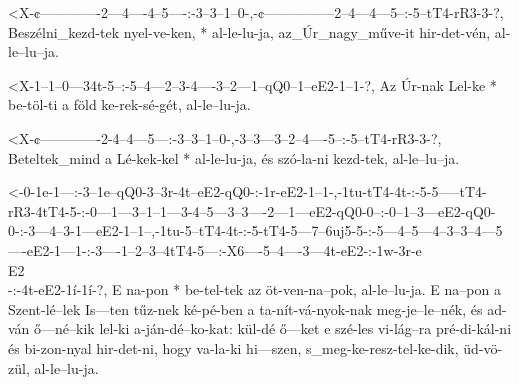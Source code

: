   {<X-¢-------------2---4----4--5----:-3--3--1--0-,-¢---------------2--4---4---5--:-5--tT4-rR3-3-?,}
  {   Beszélni_kezd-tek nyel-ve-ken, * al-le-lu-ja, az_Úr_nagy_műve-it hir-det-vén, al-le--lu--ja.}


  {<X-1--1--0---34t-5--:-5--4---2--3-4----3--2---1--qQ0--1--eE2-1--1-?,}
  {   Az Úr-nak Lel-ke * be-töl-ti a föld ke-rek-sé-gét, al-le--lu-ja.}

  {<X-¢-------------2-4--4---5---:-3--3--1--0-,-3--3---3--2--4----5--:-5--tT4-rR3-3-?,}
  {   Beteltek_mind a Lé-kek-kel * al-le-lu-ja, és szó-la-ni kezd-tek, al-le--lu--ja.}

  {<-0-1e-1---:-3--1e--qQ0-3--3r-4t--eE2-qQ0-:-1r-eE2-1--1-,-1tu-tT4-4t-:-5-5-----tT4-rR3-4tT4-5-:-0---1---3--1--1---3-4--5---3--3----2---1---eE2-qQ0-0--:-0--1--3---eE2-qQ0-0-:-3---4--3-1---eE2-1--1--,-1tu-5--tT4-4t-:-5-tT4-5---7--6uj5-5-:-5---4--5---4--3--3--4---5----eE2-1---1-:-3----1--2--3--4tT4-5---:-X6----5--4----3---4t-eE2-:-1w-3r-e\\E2\\-:-4t-eE2-1í-1í-?,}
  {  E na-pon * be-tel-tek az öt-ven-na--pok,  al-le--lu-ja. E   na--pon  a Szent-lé--lek Is---ten tűz-nek ké-pé-ben a ta-nít-vá-nyok-nak meg-je--le--nék, és ad-ván ő---né--kik lel-ki a-ján-dé--ko-kat: kül-dé ő---ket  e szé-les vi-lág--ra  pré-di-kál-ni és bi-zon-nyal hir-det-ni, hogy va-la-ki hi---szen, s_meg-ke-resz-tel-ke-dik,  üd-vö-zül,      al-le--lu-ja.}